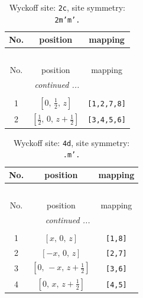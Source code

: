 \documentclass[fleqn,8pt]{jsarticle}
\begin{document}
\renewcommand{\arraystretch}{1.2}
\begin{longtable}{ccc}
\caption{Wyckoff site: {\tt 2c}, site symmetry: {\tt 2m'm'.}}
 \\
 \hline \hline
No. & position & mapping \\ \hline \endfirsthead

\multicolumn{2}{l}{\tablename\ \thetable{}} \\
 \hline \hline
No. & position & mapping \\ \hline \endhead

 \hline \hline
\multicolumn{2}{r}{\footnotesize\it continued ...} \\ \endfoot

 \hline \hline
\multicolumn{2}{r}{} \\ \endlastfoot

1 & $\left[ 0,\, \frac{1}{2},\, z \right]$ & {\tt [1,2,7,8]} \\ \hline
2 & $\left[ \frac{1}{2},\, 0,\, z + \frac{1}{2} \right]$ & {\tt [3,4,5,6]} \\
\end{longtable}
\renewcommand{\arraystretch}{1.2}
\begin{longtable}{ccc}
\caption{Wyckoff site: {\tt 4d}, site symmetry: {\tt .m'.}}
 \\
 \hline \hline
No. & position & mapping \\ \hline \endfirsthead

\multicolumn{2}{l}{\tablename\ \thetable{}} \\
 \hline \hline
No. & position & mapping \\ \hline \endhead

 \hline \hline
\multicolumn{2}{r}{\footnotesize\it continued ...} \\ \endfoot

 \hline \hline
\multicolumn{2}{r}{} \\ \endlastfoot

1 & $\left[ x,\, 0,\, z \right]$ & {\tt [1,8]} \\ \hline
2 & $\left[ - x,\, 0,\, z \right]$ & {\tt [2,7]} \\ \hline
3 & $\left[ 0,\, - x,\, z + \frac{1}{2} \right]$ & {\tt [3,6]} \\ \hline
4 & $\left[ 0,\, x,\, z + \frac{1}{2} \right]$ & {\tt [4,5]} \\
\end{longtable}
\renewcommand{\arraystretch}{1.2}
\end{document}

